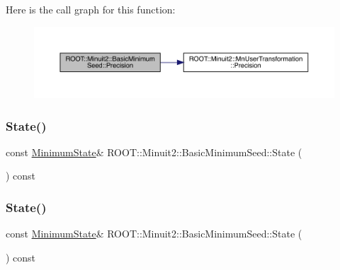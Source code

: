 Here is the call graph for this function\+:
\nopagebreak
\begin{figure}[H]
\begin{center}
\leavevmode
\includegraphics[width=350pt]{de/d50/classROOT_1_1Minuit2_1_1BasicMinimumSeed_af06c66e8851f7314915e01e0bedb200c_cgraph}
\end{center}
\end{figure}
\mbox{\label{classROOT_1_1Minuit2_1_1BasicMinimumSeed_a92e671b9a963d83076238c2e2b283e7c}} 
\subsubsection{\texorpdfstring{State()}{State()}\hspace{0.1cm}{\footnotesize\ttfamily [1/2]}}
{\footnotesize\ttfamily const \mbox{\hyperlink{classROOT_1_1Minuit2_1_1MinimumState}{Minimum\+State}}\& R\+O\+O\+T\+::\+Minuit2\+::\+Basic\+Minimum\+Seed\+::\+State (\begin{DoxyParamCaption}{ }\end{DoxyParamCaption}) const\hspace{0.3cm}{\ttfamily [inline]}}

\mbox{\label{classROOT_1_1Minuit2_1_1BasicMinimumSeed_a92e671b9a963d83076238c2e2b283e7c}} 
\subsubsection{\texorpdfstring{State()}{State()}\hspace{0.1cm}{\footnotesize\ttfamily [2/2]}}
{\footnotesize\ttfamily const \mbox{\hyperlink{classROOT_1_1Minuit2_1_1MinimumState}{Minimum\+State}}\& R\+O\+O\+T\+::\+Minuit2\+::\+Basic\+Minimum\+Seed\+::\+State (\begin{DoxyParamCaption}{ }\end{DoxyParamCaption}) const\hspace{0.3cm}{\ttfamily [inline]}}

